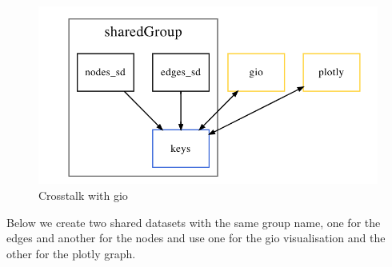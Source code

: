 \documentclass[10pt,]{krantz}
\begin{document}
\begin{figure}[H]

{\centering \includegraphics[width=1\linewidth]{images/03-crosstalk-gio} 

}

\caption{Crosstalk with gio}\label{fig:crosstalk-gio-diagram}
\end{figure}

Below we create two shared datasets with the same group name, one for the edges and another for the nodes and use one for the gio visualisation and the other for the plotly graph.
\end{document}
